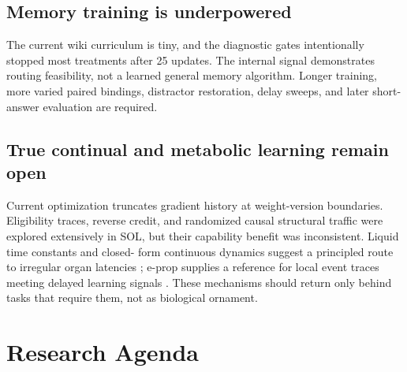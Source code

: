 \documentclass[11pt]{article}
\begin{document}
\subsection{Memory training is underpowered}

The current wiki curriculum is tiny, and the diagnostic gates intentionally stopped
most treatments after 25 updates. The internal signal demonstrates routing feasibility,
not a learned general memory algorithm. Longer training, more varied paired bindings,
distractor restoration, delay sweeps, and later short-answer evaluation are required.

\subsection{True continual and metabolic learning remain open}

Current optimization truncates gradient history at weight-version boundaries. Eligibility
traces, reverse credit, and randomized causal structural traffic were explored extensively
in SOL, but their capability benefit was inconsistent. Liquid time constants and closed-
form continuous dynamics suggest a principled route to irregular organ latencies
\cite{hasani2020ltc,hasani2022cfc}; e-prop supplies a reference for local event traces
meeting delayed learning signals \cite{bellec2020eprop}. These mechanisms should return
only behind tasks that require them, not as biological ornament.

\section{Research Agenda}
\end{document}

